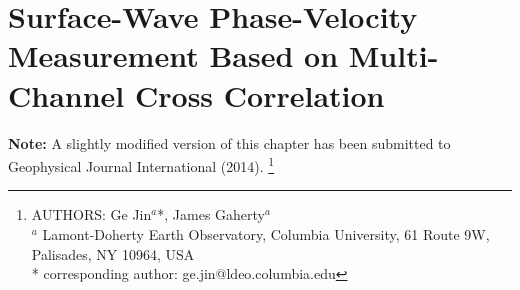 \documentclass[12pt,oneside]{book}
\begin{document}


\mainmatter




\singlespacing
\chapter[Surface-Wave Measurement Based on Cross Correlation]{Surface-Wave Phase-Velocity Measurement Based on Multi-Channel Cross Correlation}
\label{ch:aswms}
\doublespacing

\thispagestyle{fancy}

\begin{raggedright}
{\bf Note: } A slightly modified version of this chapter has been submitted to Geophysical Journal International (2014).
\footnote{AUTHORS:  Ge Jin$^a$*,  James Gaherty$^a$\\
$^a$ Lamont-Doherty Earth Observatory, Columbia University, 61 Route 9W, Palisades, NY 10964, USA\\
* corresponding author: ge.jin@ldeo.columbia.edu}
\end{raggedright}
\normalsize
\end{document}
